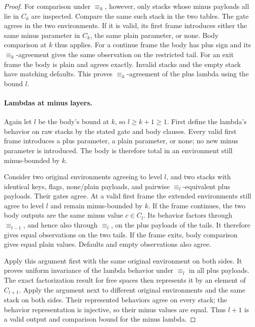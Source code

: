 \begin{proof}
For comparison under $\equiv_k$, however, only stacks whose minus
payloads all lie in $C_k$ are inspected.  Compare the same such stack in
the two tables.  The gate agrees in the two environments.  If it is
valid, its first frame introduces either the same minus parameter in
$C_k$, the same plain parameter, or none.  Body comparison at $k$ thus
applies.  For a continue frame the body has plus sign and its
$\equiv_k$-agreement gives the same observation on the restricted tail.
For an exit frame the body is plain and agrees exactly.  Invalid stacks
and the empty stack have matching defaults.  This proves
$\equiv_k$-agreement of the plus lambda using the bound $l$.

\paragraph{Lambdas at minus layers.}
\label{obs:bound-minus-lambdas}
Again let $l$ be the body's bound at $k$, so $l\geq k+1\geq 1$.
First define the lambda's behavior on raw stacks by the stated gate and
body clauses.  Every valid first frame introduces a plus parameter, a
plain parameter, or none; no new minus parameter is introduced.  The
body is therefore total in an environment still minus-bounded by $k$.

Consider two original environments agreeing to level $l$, and two
stacks with identical keys, flags, none/plain payloads, and pairwise
$\equiv_l$-equivalent plus payloads.  Their gates agree.  At a valid
first frame the extended environments still agree to level $l$ and
remain minus-bounded by $k$.  If the frame continues, the two body
outputs are the same minus value $c\in C_l$.  Its behavior factors
through $\equiv_{l-1}$, and hence also through $\equiv_l$, on the plus
payloads of the tails.  It therefore gives equal observations on the
two tails.  If the frame exits, body comparison gives equal plain
values.  Defaults and empty observations also agree.

Apply this argument first with the same original environment on both
sides.  It proves uniform invariance of the lambda behavior under
$\equiv_l$ in all plus payloads.  The exact factorization result for
free spaces then represents it by an element of $C_{l+1}$.  Apply the
argument next to different original environments and the same stack on
both sides.  Their represented behaviors agree on every stack; the
behavior representation is injective, so their minus values are equal.
Thus $l+1$ is a valid output and comparison bound for the minus lambda.


\end{proof}

